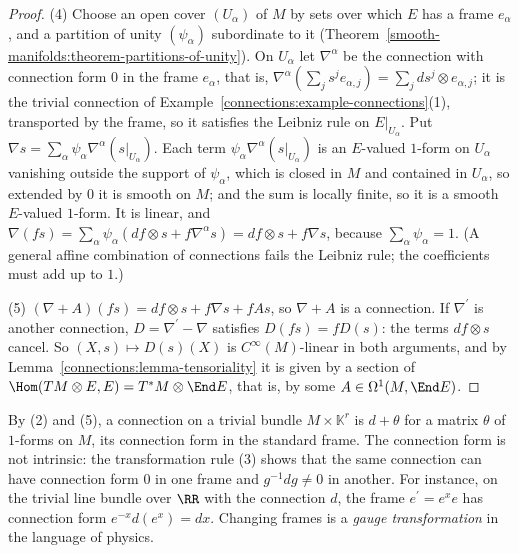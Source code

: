 \begin{proof}
(4) Choose an open cover $(U_\alpha)$ of $M$ by sets over which $E$ has a frame $e_\alpha$, and a partition of unity $(\psi_\alpha)$ subordinate to it
(Theorem~\ref{smooth-manifolds:theorem-partitions-of-unity}). On $U_\alpha$ let $\nabla^\alpha$ be the connection with connection form $0$ in the frame $e_\alpha$, that is,
$\nabla^\alpha(\sum_js^je_{\alpha,j}) = \sum_jds^j \otimes e_{\alpha,j}$; it is the trivial connection of Example~\ref{connections:example-connections}(1), transported by the frame, so it satisfies the
Leibniz rule on $E|_{U_\alpha}$. Put $\nabla s = \sum_\alpha\psi_\alpha\nabla^\alpha(s|_{U_\alpha})$. Each term $\psi_\alpha\nabla^\alpha(s|_{U_\alpha})$ is an $E$-valued $1$-form on $U_\alpha$ vanishing outside the
support of $\psi_\alpha$, which is closed in $M$ and contained in $U_\alpha$, so extended by $0$ it is smooth on $M$; and the sum is locally finite, so it is a smooth $E$-valued $1$-form. It is linear, and
$\nabla(fs) = \sum_\alpha\psi_\alpha(df \otimes s + f\nabla^\alpha s) = df \otimes s + f\nabla s$, because $\sum_\alpha\psi_\alpha = 1$. (A general affine combination of connections
fails the Leibniz rule; the coefficients must add up to $1$.)

(5) $(\nabla + A)(fs) = df \otimes s + f\nabla s + fAs$, so $\nabla + A$ is a connection. If $\nabla^{\prime}$ is another connection, $D = \nabla^{\prime} - \nabla$ satisfies
$D(fs) = fD(s)$: the terms $df \otimes s$ cancel. So $(X, s) \mapsto D(s)(X)$ is $C^\infty(M)$-linear in both arguments, and by Lemma~\ref{connections:lemma-tensoriality} it is given
by a section of $\Hom(TM \otimes E, E) = T^*M \otimes \End E$, that is, by some $A \in \Omega^1(M, \End E)$.
\end{proof}

By (2) and (5), a connection on a trivial bundle $M \times \mathbb{K}^r$ is $d + \theta$ for a matrix $\theta$ of $1$-forms on $M$, its connection form in the standard frame.
The connection form is not intrinsic: the transformation rule (3) shows that the same connection can have connection form $0$ in one frame and $g^{-1}dg \neq 0$ in another. For
instance, on the trivial line bundle over $\RR$ with the connection $d$, the frame $e^{\prime} = e^xe$ has connection form $e^{-x}d(e^x) = dx$. Changing frames is a \emph{gauge
transformation} in the language of physics.

